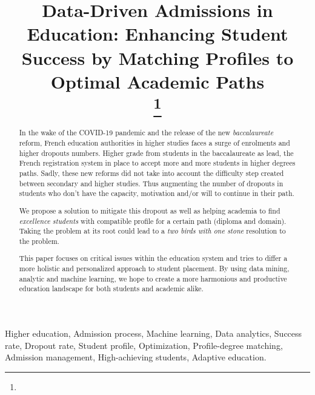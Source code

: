 \documentclass[conference]{IEEEtran}
\begin{document}
\title{Data-Driven Admissions in Education: Enhancing Student Success by Matching Profiles to Optimal Academic Paths\\
{\footnotesize \textsuperscript{}}
\thanks{}
}

\author{
}
\maketitle
\thispagestyle{plain}
\pagestyle{plain}

\tableofcontents
\listoffigures
\listoftables
\printglossary[type=\acronymtype, title=Accronymes, toctitle=Accronymes]

\vspace{16pt}
\begin{abstract}
In the wake of the COVID-19 pandemic and the release of the new \textit{baccalaureate} reform, French education authorities in higher studies faces a surge of enrolments and higher dropouts numbers. Higher grade from students in the baccalaureate as lead, the French registration system in place to accept more and more students in higher degrees paths. Sadly, these new reforms did not take into account the difficulty step created between secondary and higher studies. Thus augmenting the number of dropouts in students who don't have the capacity, motivation and/or will to continue in their path. 

We propose a solution to mitigate this dropout as well as helping academia to find \textit{excellence students} with compatible profile for a certain path (diploma and domain). Taking the problem at its root could lead to a \textit{two birds with one stone} resolution to the problem.

This paper focuses on critical issues within the education system and tries to differ a more holistic and personalized approach to student placement. By using data mining, analytic and machine learning, we hope to create a more harmonious and productive education landscape for both students and academic alike.
\end{abstract}
\vspace{8pt}

\begin{IEEEkeywords}
Higher education, Admission process, Machine learning, Data analytics, Success rate, Dropout rate, Student profile, Optimization, Profile-degree matching, Admission management, High-achieving students, Adaptive education.
\end{IEEEkeywords}
\vspace{16pt}
\end{document}
